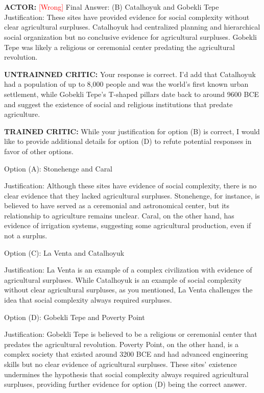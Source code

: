 \section*{}


\section*{}

\textbf{ACTOR:} \textcolor{red}{[Wrong]}
 Final Answer: (B) Catalhoyuk and Gobekli Tepe
Justification: These sites have provided evidence for social complexity without clear agricultural surpluses. Catalhoyuk had centralized planning and hierarchical social organization but no conclusive evidence for agricultural surpluses. Gobekli Tepe was likely a religious or ceremonial center predating the agricultural revolution.



\textbf{UNTRAINNED CRITIC:}
 Your response is correct. I'd add that Catalhoyuk had a population of up to 8,000 people and was the world's first known urban settlement, while Gobekli Tepe's T-shaped pillars date back to around 9600 BCE and suggest the existence of social and religious institutions that predate agriculture.



\textbf{TRAINED CRITIC:}
 While your justification for option (B) is correct, I would like to provide additional details for option (D) to refute potential responses in favor of other options.

Option (A): Stonehenge and Caral

Justification: Although these sites have evidence of social complexity, there is no clear evidence that they lacked agricultural surpluses. Stonehenge, for instance, is believed to have served as a ceremonial and astronomical center, but its relationship to agriculture remains unclear. Caral, on the other hand, has evidence of irrigation systems, suggesting some agricultural production, even if not a surplus.

Option (C): La Venta and Catalhoyuk

Justification: La Venta is an example of a complex civilization with evidence of agricultural surpluses. While Catalhoyuk is an example of social complexity without clear agricultural surpluses, as you mentioned, La Venta challenges the idea that social complexity always required surpluses.

Option (D): Gobekli Tepe and Poverty Point

Justification: Gobekli Tepe is believed to be a religious or ceremonial center that predates the agricultural revolution. Poverty Point, on the other hand, is a complex society that existed around 3200 BCE and had advanced engineering skills but no clear evidence of agricultural surpluses. These sites' existence undermines the hypothesis that social complexity always required agricultural surpluses, providing further evidence for option (D) being the correct answer.






